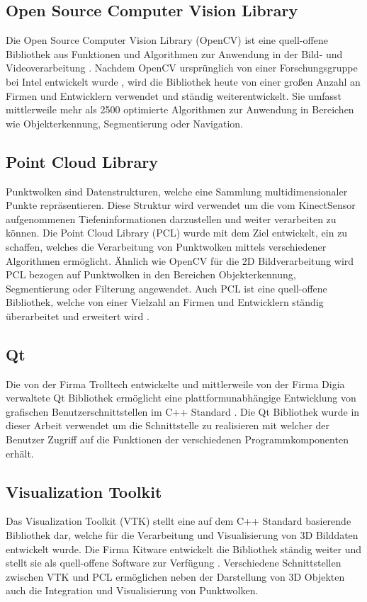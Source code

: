 \subsection{Open Source Computer Vision Library}
Die Open Source Computer Vision Library (OpenCV) ist eine quell-offene Bibliothek aus Funktionen und Algorithmen zur Anwendung in der Bild- und Videoverarbeitung \cite{OpenCV}. Nachdem OpenCV ursprünglich von einer Forschungsgruppe bei Intel entwickelt wurde \cite{Laganiere2011}, wird die Bibliothek heute von einer großen Anzahl an Firmen und Entwicklern verwendet und ständig weiterentwickelt. Sie umfasst mittlerweile mehr als 2500 optimierte Algorithmen zur Anwendung in Bereichen wie Objekterkennung, Segmentierung oder Navigation.

\subsection{Point Cloud Library}
Punktwolken sind Datenstrukturen, welche eine Sammlung multidimensionaler Punkte repräsentieren. Diese Struktur wird verwendet um die vom Kinect\red[TM] Sensor aufgenommenen Tiefeninformationen darzustellen und weiter verarbeiten zu können. Die Point Cloud Library (PCL) wurde mit dem Ziel entwickelt, ein \red[Rahmenwerk] zu schaffen, welches die Verarbeitung von Punktwolken mittels verschiedener Algorithmen ermöglicht. Ähnlich wie OpenCV für die 2D Bildverarbeitung wird PCL bezogen auf Punktwolken in den Bereichen Objekterkennung, Segmentierung oder Filterung angewendet. Auch PCL ist eine quell-offene Bibliothek, welche von einer Vielzahl an Firmen und Entwicklern ständig überarbeitet und erweitert wird \cite{PCL}.

\subsection{Qt}
Die von der Firma Trolltech entwickelte und mittlerweile von der Firma Digia verwaltete Qt Bibliothek ermöglicht eine plattformunabhängige Entwicklung von grafischen Benutzerschnittstellen im C++ Standard \cite{Qt}. Die Qt Bibliothek wurde in dieser Arbeit verwendet um die Schnittstelle zu realisieren mit welcher der Benutzer Zugriff auf die Funktionen der verschiedenen Programmkomponenten erhält.

\subsection{Visualization Toolkit}
Das Visualization Toolkit (VTK) stellt eine auf dem C++ Standard basierende Bibliothek dar, welche für die Verarbeitung und Visualisierung von 3D Bilddaten entwickelt wurde. Die Firma Kitware entwickelt die Bibliothek ständig weiter und stellt sie als quell-offene Software zur Verfügung \cite{VTK}. Verschiedene Schnittstellen zwischen VTK und PCL ermöglichen neben der Darstellung von 3D Objekten auch die Integration und Visualisierung von Punktwolken. \red[Ausführlicher?]

